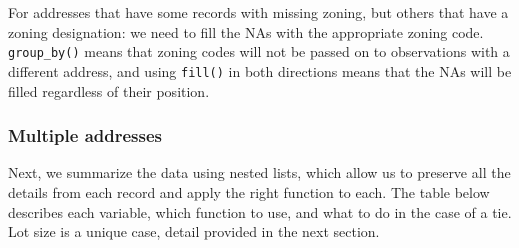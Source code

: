 \documentclass[]{article}
\newenvironment{Shaded}{\begin{snugshade}}{\end{snugshade}}
\newcommand{\KeywordTok}[1]{\textcolor[rgb]{0.13,0.29,0.53}{\textbf{#1}}}
\newcommand{\DataTypeTok}[1]{\textcolor[rgb]{0.13,0.29,0.53}{#1}}
\newcommand{\StringTok}[1]{\textcolor[rgb]{0.31,0.60,0.02}{#1}}
\newcommand{\OperatorTok}[1]{\textcolor[rgb]{0.81,0.36,0.00}{\textbf{#1}}}
\newcommand{\NormalTok}[1]{#1}
\begin{document}
\begin{Shaded}
\end{Shaded}

For addresses that have some records with missing zoning, but others
that have a zoning designation: we need to fill the NAs with the
appropriate zoning code. \texttt{group\_by()} means that zoning codes
will not be passed on to observations with a different address, and
using \texttt{fill()} in both directions means that the NAs will be
filled regardless of their position.

\subsubsection{Multiple addresses}\label{multiple-addresses}

\begin{Shaded}
\end{Shaded}

Next, we summarize the data using nested lists, which allow us to
preserve all the details from each record and apply the right function
to each. The table below describes each variable, which function to use,
and what to do in the case of a tie. Lot size is a unique case, detail
provided in the next section.
\end{document}

